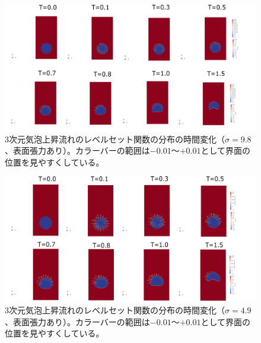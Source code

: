 \documentclass[8pt,a4paper]{article}
\begin{document}
\begin{figure}[H]
	\centering
	\includegraphics[width=18truecm]{pics/3d-bubble/result_sigma9_8.pdf}
	\caption{3次元気泡上昇流れのレベルセット関数の分布の時間変化（$\sigma=9.8$、表面張力あり）。カラーバーの範囲は$-0.01$～$+0.01$として界面の位置を見やすくしている。}
	\label{fig:3d-bubble_result_sigma9.8}
\end{figure}

\begin{figure}[H]
	\centering
	\includegraphics[width=18truecm]{pics/3d-bubble/result_sigma4_9.pdf}
	\caption{3次元気泡上昇流れのレベルセット関数の分布の時間変化（$\sigma=4.9$、表面張力あり）。カラーバーの範囲は$-0.01$～$+0.01$として界面の位置を見やすくしている。}
	\label{fig:3d-bubble_result_sigma4.9}
\end{figure}
\end{document}
